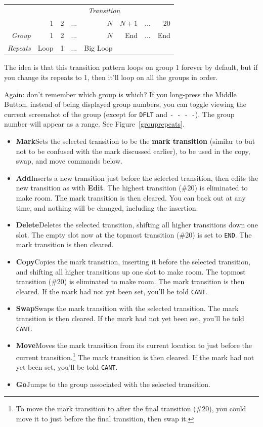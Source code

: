 \documentclass{article}
\begin{document}
\begin{itemize}
\hspace{8em}\begin{tabular}{r@{~~~}|rrrrrrr}
		&\multicolumn{7}{c}{\it Transition}\\
				&1&2& ... & \(N\) & \(N+1\)& ... &20\\
				\hline
		 \it Group &1&2&...&\(N\)&End& ... &End\\
		\it Repeats&Loop&1&...&Big Loop&&&\\
\end{tabular}
\vspace{1em}

The idea is that this transition pattern loops on group 1 forever by default, but if you change its repeats to 1, then it'll loop on all the groups in order.

Again: don't remember which group is which?  If you long-press the Middle Button, instead of being displayed group numbers, you can toggle viewing the current screenshot of the group (except for \texttt{DFLT} and \texttt{- - - -}).  The group number will appear as a range.  See Figure~\ref{grouprepeats}.

\begin{itemize}
	\item {\bf Mark}\quad Sets the selected transition to be the {\bf mark transition} (similar to but not to be confused with the mark discussed earlier), to be used in the copy, swap, and move commands below.
	\item {\bf Add}\quad Inserts a new transition just before the selected transition, then edits the new transition as with {\bf Edit}.  The highest transition (\#20) is eliminated to make room.    The mark transition is then cleared. You can back out at any time, and nothing will be changed, including the insertion.
	\item {\bf Delete}\quad Deletes the selected transition, shifting all higher transitions down one slot.  The empty slot now at the topmost transition (\#20) is set to \texttt{END}.  The mark transition is then cleared.
	\item {\bf Copy}\quad Copies the mark transition, inserting it before the selected transition, and shifting all higher transitions up one slot to make room.  The topmost transition  (\#20) is eliminated to make room.  The mark transition is then cleared.  If the mark had not yet been set, you'll be told {\tt CANT}.
	\item {\bf Swap}\quad Swaps the mark transition with the selected transition.  The mark transition is then cleared.   If the mark had not yet been set, you'll be told {\tt CANT}.
	\item {\bf Move}\quad Moves the mark transition from its current location to just before the current transition.\footnote{To move the mark transition to after the final transition (\#20), you could move it to just before the final transition, then swap it.} The mark transition is then cleared. If the mark had not yet been set, you'll be told {\tt CANT}.
	\item {\bf Go}\quad Jumps to the group associated with the selected transition.
	\end{itemize}


\end{itemize}
\end{document}
